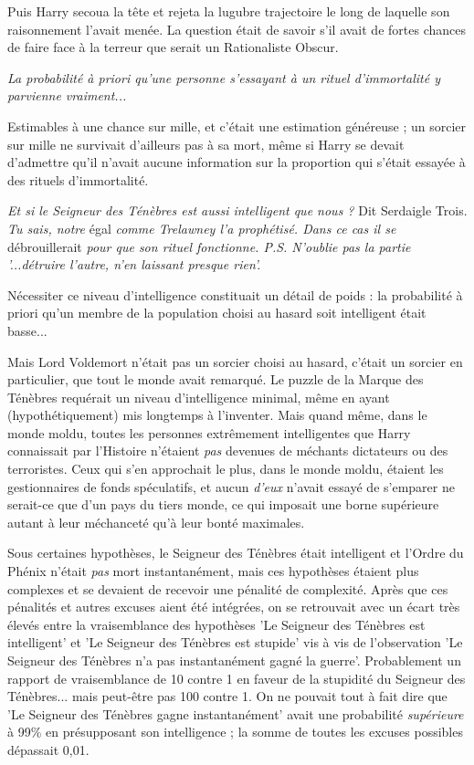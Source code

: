 Puis Harry secoua la tête et rejeta la lugubre trajectoire le long de laquelle son raisonnement l'avait menée. La question était de savoir s'il avait de fortes chances de faire face à la terreur que serait un Rationaliste Obscur.

\emph{La probabilité à priori qu'une personne s'essayant à un rituel d'immortalité y parvienne vraiment...} 

Estimables à une chance sur mille, et c'était une estimation généreuse ; un sorcier sur mille ne survivait d'ailleurs pas à sa mort, même si Harry se devait d'admettre qu'il n'avait aucune information sur la proportion qui s'était essayée à des rituels d'immortalité.

\emph{Et si le Seigneur des Ténèbres est aussi intelligent que nous ? } Dit Serdaigle Trois. \emph{Tu sais, notre } égal\emph{ comme Trelawney l'a prophétisé. Dans ce cas il se } débrouillerait \emph{pour que son rituel fonctionne. P.S. N'oublie pas la partie '...détruire l'autre, n'en laissant presque rien'.} 

Nécessiter ce niveau d'intelligence constituait un détail de poids : la probabilité à priori qu'un membre de la population choisi au hasard soit intelligent était basse...

Mais Lord Voldemort n'était pas un sorcier choisi au hasard, c'était un sorcier en particulier, que tout le monde avait remarqué. Le puzzle de la Marque des Ténèbres requérait un niveau d'intelligence minimal, même en ayant (hypothétiquement) mis longtemps à l'inventer. Mais quand même, dans le monde moldu, toutes les personnes extrêmement intelligentes que Harry connaissait par l'Histoire n'étaient \emph{pas}  devenues de méchants dictateurs ou des terroristes. Ceux qui s'en approchait le plus, dans le monde moldu, étaient les gestionnaires de fonds spéculatifs, et aucun \emph{d'eux}  n'avait essayé de s'emparer ne serait-ce que d'un pays du tiers monde, ce qui imposait une borne supérieure autant à leur méchanceté qu'à leur bonté maximales.

Sous certaines hypothèses, le Seigneur des Ténèbres était intelligent et l'Ordre du Phénix n'était \emph{pas } mort instantanément, mais ces hypothèses étaient plus complexes et se devaient de recevoir une pénalité de complexité. Après que ces pénalités et autres excuses aient été intégrées, on se retrouvait avec un écart très élevés entre la vraisemblance des hypothèses 'Le Seigneur des Ténèbres est intelligent' et 'Le Seigneur des Ténèbres est stupide' vis à vis de l'observation 'Le Seigneur des Ténèbres n'a pas instantanément gagné la guerre'. Probablement un rapport de vraisemblance de 10 contre 1 en faveur de la stupidité du Seigneur des Ténèbres... mais peut-être pas 100 contre 1. On ne pouvait tout à fait dire que 'Le Seigneur des Ténèbres gagne instantanément' avait une probabilité \emph{supérieure}  à 99\% en présupposant son intelligence ; la somme de toutes les excuses possibles dépassait 0,01.

